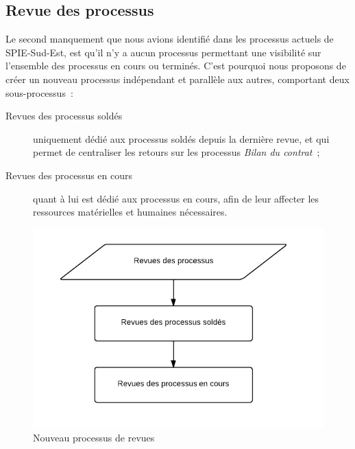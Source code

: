\subsection{Revue des processus}

Le second manquement que nous avions identifié dans les processus actuels de SPIE-Sud-Est, est qu'il n'y a aucun processus permettant une visibilité sur l'ensemble des processus en cours ou terminés. 
C'est pourquoi nous proposons de créer un nouveau processus indépendant et parallèle aux autres, comportant deux sous-processus~:

\begin{description}
    \item[Revues des processus soldés] uniquement dédié aux processus soldés depuis la dernière revue, et qui permet de centraliser les retours sur les processus \textit{Bilan du contrat}~;
    \item[Revues des processus en cours] quant à lui est dédié aux processus en cours, afin de leur affecter les ressources matérielles et humaines nécessaires.
\end{description}

\begin{figure}[h!]
	\centering
	\includegraphics[width=0.45\linewidth]{images/processus_revues.png}
	\caption{Nouveau processus de revues}
	\label{fig:processusRevue}
\end{figure}


